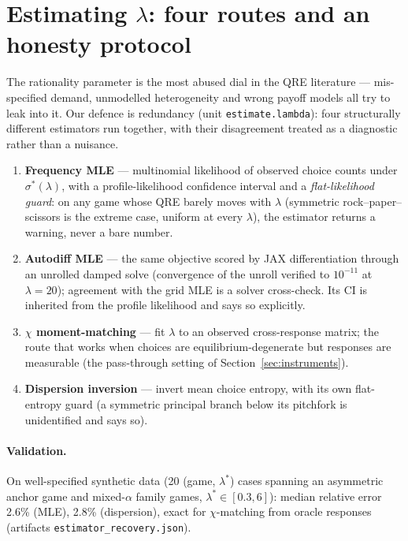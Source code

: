 \section{Estimating $\lambda$: four routes and an honesty protocol}
\label{sec:estimation}

The rationality parameter is the most abused dial in the QRE literature ---
mis-specified demand, unmodelled heterogeneity and wrong payoff models all
try to leak into it. Our defence is redundancy (unit
\texttt{estimate.lambda}): four structurally different estimators run
together, with their disagreement treated as a diagnostic rather than a
nuisance.

\begin{enumerate}
\item \textbf{Frequency MLE} --- multinomial likelihood of observed choice
counts under $\sigma^*(\lambda)$, with a profile-likelihood confidence
interval and a \emph{flat-likelihood guard}: on any game whose QRE barely
moves with $\lambda$ (symmetric rock--paper--scissors is the extreme case,
uniform at every $\lambda$), the estimator returns a warning, never a bare
number.
\item \textbf{Autodiff MLE} --- the same objective scored by JAX
differentiation through an unrolled damped solve (convergence of the unroll
verified to $10^{-11}$ at $\lambda = 20$); agreement with the grid MLE is a
solver cross-check. Its CI is inherited from the profile likelihood and
says so explicitly.
\item \textbf{$\chi$ moment-matching} --- fit $\lambda$ to an observed
cross-response matrix; the route that works when choices are
equilibrium-degenerate but responses are measurable (the pass-through
setting of Section~\ref{sec:instruments}).
\item \textbf{Dispersion inversion} --- invert mean choice entropy, with
its own flat-entropy guard (a symmetric principal branch below its
pitchfork is unidentified and says so).
\end{enumerate}

\paragraph{Validation.} On well-specified synthetic data (20 (game,
$\lambda^*$) cases spanning an asymmetric anchor game and mixed-$\alpha$
family games, $\lambda^* \in [0.3, 6]$): median relative error 2.6\% (MLE),
2.8\% (dispersion), exact for $\chi$-matching from oracle responses
(artifacts \texttt{estimator\_recovery.json}).

